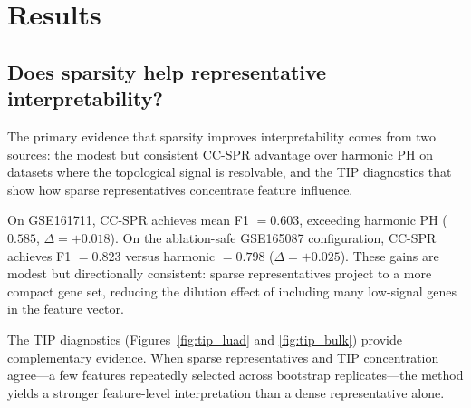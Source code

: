 \documentclass[11pt]{article}
\begin{document}
\section{Results}
\label{sec:results}

\subsection{Does sparsity help representative interpretability?}

The primary evidence that sparsity improves interpretability comes from two sources: the modest but consistent CC-SPR advantage over harmonic PH on datasets where the topological signal is resolvable, and the TIP diagnostics that show how sparse representatives concentrate feature influence.

On GSE161711, CC-SPR achieves mean F1 $= 0.603$, exceeding harmonic PH ($0.585$, $\Delta = +0.018$).
On the ablation-safe GSE165087 configuration, CC-SPR achieves F1 $= 0.823$ versus harmonic $= 0.798$ ($\Delta = +0.025$).
These gains are modest but directionally consistent: sparse representatives project to a more compact gene set, reducing the dilution effect of including many low-signal genes in the feature vector.

The TIP diagnostics (Figures~\ref{fig:tip_luad} and \ref{fig:tip_bulk}) provide complementary evidence.
When sparse representatives and TIP concentration agree---a few features repeatedly selected across bootstrap replicates---the method yields a stronger feature-level interpretation than a dense representative alone.
\end{document}
